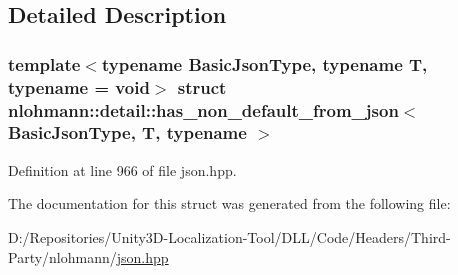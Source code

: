 \subsection{Detailed Description}
\subsubsection*{template$<$typename Basic\+Json\+Type, typename T, typename = void$>$\newline
struct nlohmann\+::detail\+::has\+\_\+non\+\_\+default\+\_\+from\+\_\+json$<$ Basic\+Json\+Type, T, typename $>$}



Definition at line 966 of file json.\+hpp.



The documentation for this struct was generated from the following file\+:\begin{DoxyCompactItemize}
\item 
D\+:/\+Repositories/\+Unity3\+D-\/\+Localization-\/\+Tool/\+D\+L\+L/\+Code/\+Headers/\+Third-\/\+Party/nlohmann/\mbox{\hyperlink{json_8hpp}{json.\+hpp}}\end{DoxyCompactItemize}

